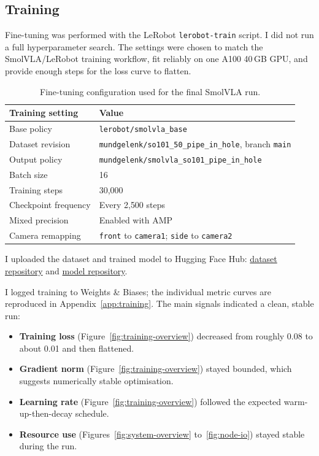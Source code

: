 \documentclass[11pt, a4paper]{article}
\begin{document}
\subsection{Training}
\label{sec:training}

Fine-tuning was performed with the LeRobot \texttt{lerobot-train} script. I did not run a full hyperparameter search. The settings were chosen to match the SmolVLA/LeRobot training workflow, fit reliably on one A100 40\,GB GPU, and provide enough steps for the loss curve to flatten.

\begin{table}[H]
\centering
\renewcommand{\arraystretch}{1.2}
\begin{tabular}{@{}p{}p{}@{}}
\toprule
\textbf{Training setting} & \textbf{Value} \\ \midrule
Base policy & \texttt{lerobot/smolvla\_base} \\
Dataset revision & \texttt{mundgelenk/so101\_50\_pipe\_in\_hole}, branch \texttt{main} \\
Output policy & \texttt{mundgelenk/smolvla\_so101\_pipe\_in\_hole} \\
Batch size & 16 \\
Training steps & 30{,}000 \\
Checkpoint frequency & Every 2{,}500 steps \\
Mixed precision & Enabled with AMP \\
Camera remapping & \texttt{front} to \texttt{camera1}; \texttt{side} to \texttt{camera2} \\
\bottomrule
\end{tabular}
\caption{Fine-tuning configuration used for the final SmolVLA run.}
\label{tab:training-settings}
\end{table}

I uploaded the dataset and trained model to Hugging Face Hub: \href{https://huggingface.co/datasets/mundgelenk/so101_50_pipe_in_hole}{dataset repository} and \href{https://huggingface.co/mundgelenk/smolvla_so101_pipe_in_hole}{model repository}.

I logged training to Weights \& Biases; the individual metric curves are reproduced in Appendix~\ref{app:training}. The main signals indicated a clean, stable run:

\begin{itemize}
    \item \textbf{Training loss} (Figure~\ref{fig:training-overview}) decreased from roughly 0.08 to about 0.01 and then flattened.
    \item \textbf{Gradient norm} (Figure~\ref{fig:training-overview}) stayed bounded, which suggests numerically stable optimisation.
    \item \textbf{Learning rate} (Figure~\ref{fig:training-overview}) followed the expected warm-up-then-decay schedule.
    \item \textbf{Resource use} (Figures~\ref{fig:system-overview} to~\ref{fig:node-io}) stayed stable during the run.
\end{itemize}
\end{document}
